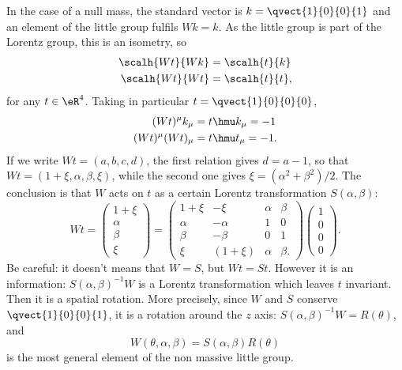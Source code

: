 In the case of a null mass, the standard vector is $k=\qvect{1}{0}{0}{1}$ and an element of the little group fulfils $Wk=k$. As the little group is part of the Lorentz group, this is an isometry, so
\begin{subequations}
	\begin{align}
		\scalh{Wt}{Wk} & =\scalh{t}{k}  \\
		\scalh{Wt}{Wt} & =\scalh{t}{t},
	\end{align}
\end{subequations}
for any $t\in\eR^4$. Taking in particular $t=\qvect{1}{0}{0}{0}$,
\begin{subequations}
	\begin{align}
		(Wt)^{\mu}k_{\mu}    & =t\hmu k_{\mu}=-1  \\
		(Wt)^{\mu}(Wt)_{\mu} & =t\hmu t_{\mu}=-1.
	\end{align}
\end{subequations}
If we write $Wt=({a},{b},{c},{d})$,  the first relation gives $d=a-1$, so that  $Wt=({1+\xi},{\alpha},{\beta},{\xi})$, while the second one gives $\xi=(\alpha^2+\beta^2)/2$. The conclusion is that $W$ acts on $t$ as a certain Lorentz transformation $S(\alpha,\beta)$:
\begin{equation}
	Wt=\begin{pmatrix}
		1+\xi  \\
		\alpha \\
		\beta  \\
		\xi
	\end{pmatrix}=
	\begin{pmatrix}
		1+\xi  & -\xi    & \alpha & \beta  \\
		\alpha & -\alpha & 1      & 0      \\
		\beta  & -\beta  & 0      & 1      \\
		\xi    & (1+\xi) & \alpha & \beta.
	\end{pmatrix}
	\begin{pmatrix}
		1 \\
		0 \\
		0 \\
		0
	\end{pmatrix}.
\end{equation}
Be careful: it doesn't means that $W=S$, but $Wt=St$. However it is an information: $S(\alpha,\beta)^{-1} W$ is a Lorentz transformation which leaves $t$ invariant. Then it is a spatial rotation. More precisely, since $W$ and $S$ conserve $\qvect{1}{0}{0}{1}$, it is a rotation around the $z$ axis: $S(\alpha,\beta)^{-1} W=R(\theta)$, and
\begin{equation}
	W(\theta,\alpha,\beta)=S(\alpha,\beta)R(\theta)
\end{equation}
is the most general element of the non massive little group.
